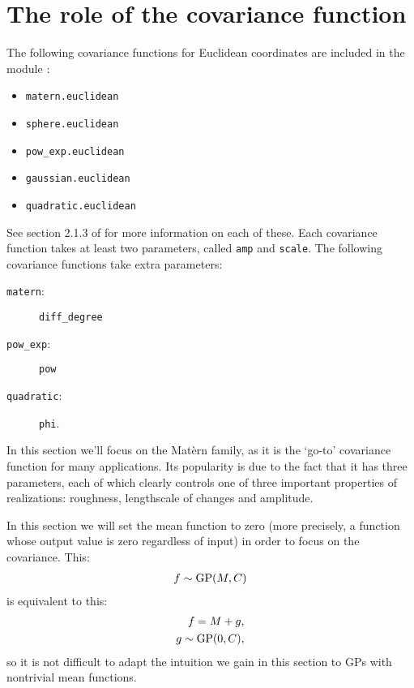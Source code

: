 \section{The role of the covariance function}\label{sec:cov}
The following covariance functions for Euclidean coordinates are included in the module :
\begin{itemize}
    \item \texttt{matern.euclidean}
    \item \texttt{sphere.euclidean}
    \item \texttt{pow_exp.euclidean}
    \item \texttt{gaussian.euclidean}
    \item \texttt{quadratic.euclidean}
\end{itemize}
See section 2.1.3 of  \cite{banerjee} for more information on each of these. Each covariance function takes at least two parameters, called \texttt{amp} and \texttt{scale}. The following covariance functions take extra parameters:
\begin{description}
    \item[\texttt{matern}:] \texttt{diff_degree}
    \item[\texttt{pow_exp}:] \texttt{pow}
    \item[\texttt{quadratic}:] \texttt{phi}.
\end{description}

In this section we'll focus on the Mat\`ern family, as it is the `go-to' covariance function for many applications. Its popularity is due to the fact that it has three parameters, each of which clearly controls one of three important properties of realizations: roughness, lengthscale of changes and amplitude.

In this section we will set the mean function to zero (more precisely, a function whose output value is zero regardless of input) in order to focus on the covariance. This:
\begin{eqnarray*}
    f\sim\textup{GP}(M,C)
\end{eqnarray*}
is equivalent to this:
\begin{eqnarray*}
    f = M + g, \\g\sim \textup{GP}(0,C),
\end{eqnarray*}
so it is not difficult to adapt the intuition we gain in this section to GPs with nontrivial mean functions.

